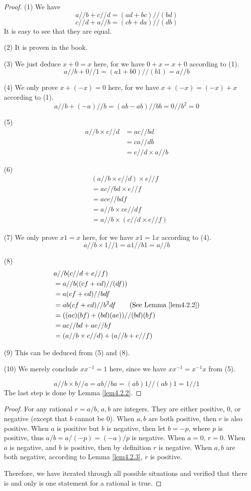 \begin{proof}
(1)
We have
\[
a//b + c//d = (ad+bc)//(bd)
\]
\[
c//d + a//b = (cb+da)//(db)
\]
It is easy to see that they are equal.

(2)
It is proven in the book.

(3)
We just deduce $x+0=x$ here, for we have $0+x=x+0$ according to (1).
\[
a//b + 0//1 = (a1+b0)//(b1) = a//b
\]

(4)
We only prove $x+(-x)=0$ here, for we have $x+(-x)=(-x)+x$ according to (1).
\[
a//b+(-a)//b= (ab-ab)//bb = 0//b^2=0
\]

(5)
\begin{align*}
a//b \times c//d
&= ac//bd \\
&= ca//db \\
&= c//d \times a//b
\end{align*}

(6)
\begin{align*}
&(a//b \times c//d) \times e//f \\
&= ac//bd \times e//f \\
&= ace//bdf \\
&= a//b \times ce//df \\
&= a//b \times (c//d \times e//f)
\end{align*}

(7)
We only prove $x1=x$ here, for we have $x1=1x$ according to (4).
\[
a//b \times 1//1 = a1//b1 = a//b
\]

(8)
\begin{align*}
&a//b (c//d + e//f) \\
&= a//b ((cf+ed) // (df)) \\
&= a(cf+ed)//bdf \\
&= ab(cf+ed) // b^2df \tag{See Lemma \ref{lem4.2.2}} \\
&= ((ac)(bf) + (bd)(ae)) // (bd)(bf) \\
&= ac//bd + ae//bf \\
&= (a//b \times c//d) + (a//b + e//f)
\end{align*}

(9)
This can be deduced from (5) and (8).

(10)
We merely conclude $xx^{-1} = 1$ here, since we have $xx^{-1} = x^{-1}x$ from (5).

\[
a//b \times b//a  = ab//ba = (ab)1//(ab)1 = 1//1
\]
The last step is done by Lemma \ref{lem4.2.2}.
\end{proof}

\begin{proof}
For any rational $r = a/b$, $a,b$ are integers.
They are either positive, $0$, or negative (except that $b$ cannot be 0). When $a,b$ are both positive, 
then $r$ is also positive. When $a$ is positive but $b$ is negative, then let $b=-p$, where $p$ is 
positive, thus $a/b = a/(-p) = (-a)/p$ is negative. When $a=0$, $r=0$. When $a$ is negative, and $b$ is 
positive, then by definition $r$ is negative. When $a,b$ are both negative, according to Lemma 
\ref{lem4.2.3}, $r$ is positive.

Therefore, we have iterated through all possible situations and verified that there is and only is one 
statement for a rational is true.
\end{proof}

